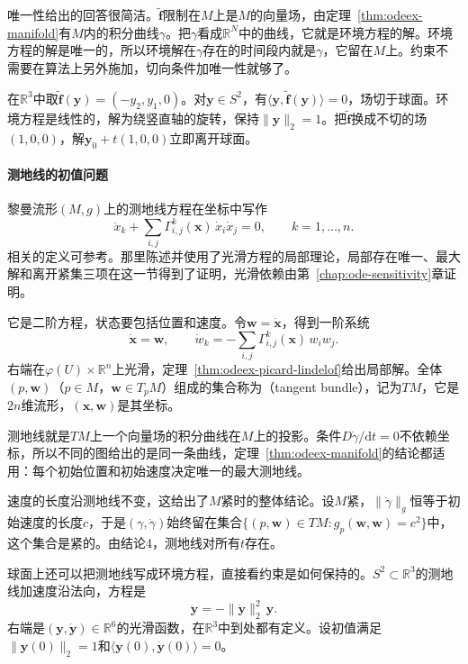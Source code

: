 唯一性给出的回答很简洁。$\tilde{\bm{f}}$限制在$M$上是$M$的向量场，由定理~\ref{thm:odeex-manifold}有$M$内的积分曲线$\gamma$。把$\gamma$看成$\mathbb{R}^{N}$中的曲线，它就是环境方程的解。环境方程的解是唯一的，所以环境解在$\gamma$存在的时间段内就是$\gamma$，它留在$M$上。约束不需要在算法上另外施加，切向条件加唯一性就够了。

\begin{example}[球面上的旋转场]
\label{ex:odeex-sphere-rotation}
在$\mathbb{R}^{3}$中取$\tilde{\bm{f}}(\bm{y})=(-y_2,y_1,0)$。对$\bm{y}\in S^2$，有$\langle\bm{y},\tilde{\bm{f}}(\bm{y})\rangle=0$，场切于球面。环境方程是线性的，解为绕竖直轴的旋转，保持$\lVert\bm{y}\rVert_2=1$。把$\tilde{\bm{f}}$换成不切的场$(1,0,0)$，解$\bm{y}_0+t(1,0,0)$立即离开球面。
\end{example}

\paragraph{测地线的初值问题}
黎曼流形$(M,g)$上的测地线方程在坐标中写作
\begin{equation}
 \ddot x_k+\sum_{i,j}\Gamma^k_{i,j}(\bm{x})\,\dot x_i\dot x_j=0,\qquad k=1,\ldots,n.
 \label{eq:odeex-geodesic}
\end{equation}
相关的定义可参考。那里陈述并使用了光滑方程的局部理论，局部存在唯一、最大解和离开紧集三项在这一节得到了证明，光滑依赖由第~\ref{chap:ode-sensitivity}章证明。

它是二阶方程，状态要包括位置和速度。令$\bm{w}=\dot{\bm{x}}$，得到一阶系统
\[
 \dot{\bm{x}}=\bm{w},\qquad\dot w_k=-\sum_{i,j}\Gamma^k_{i,j}(\bm{x})\,w_iw_j.
\]
右端在$\varphi(U)\times\mathbb{R}^{n}$上光滑，定理~\ref{thm:odeex-picard-lindelof}给出局部解。全体$(p,\bm{w})$（$p\in M$，$\bm{w}\in T_pM$）组成的集合称为（tangent bundle），记为$TM$，它是$2n$维流形，$(\bm{x},\bm{w})$是其坐标。

测地线就是$TM$上一个向量场的积分曲线在$M$上的投影。条件$D\dot\gamma/\mathrm{d}t=0$不依赖坐标，所以不同的图给出的是同一条曲线，定理~\ref{thm:odeex-manifold}的结论都适用：每个初始位置和初始速度决定唯一的最大测地线。

速度的长度沿测地线不变，这给出了$M$紧时的整体结论。设$M$紧，$\lVert\dot\gamma\rVert_g$恒等于初始速度的长度$c$，于是$(\gamma,\dot\gamma)$始终留在集合$\{(p,\bm{w})\in TM:g_p(\bm{w},\bm{w})=c^2\}$中，这个集合是紧的。由结论4，测地线对所有$t$存在。

球面上还可以把测地线写成环境方程，直接看约束是如何保持的。$S^2\subset\mathbb{R}^{3}$的测地线加速度沿法向，方程是
\begin{equation}
 \ddot{\bm{y}}=-\lVert\dot{\bm{y}}\rVert_2^2\,\bm{y}.
 \label{eq:odeex-sphere-geodesic}
\end{equation}
右端是$(\bm{y},\dot{\bm{y}})\in\mathbb{R}^{6}$的光滑函数，在$\mathbb{R}^{3}$中到处都有定义。设初值满足$\lVert\bm{y}(0)\rVert_2=1$和$\langle\bm{y}(0),\dot{\bm{y}}(0)\rangle=0$。

